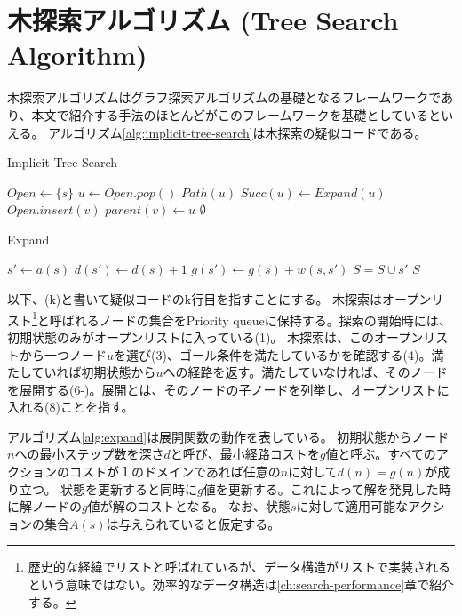 \documentclass[10pt]{book}
\begin{document}
\section{木探索アルゴリズム (Tree Search Algorithm)}
\label{sec:tree-search-algorithm}
木探索アルゴリズムはグラフ探索アルゴリズムの基礎となるフレームワークであり、本文で紹介する手法のほとんどがこのフレームワークを基礎としているといえる。
アルゴリズム\ref{alg:implicit-tree-search}は木探索の疑似コードである。

\begin{algorithm}
\caption{Implicit Tree Search}
\label{alg:implicit-tree-search}
	$Open \leftarrow \{s\}$\;
	 {
		$u \leftarrow Open.pop()$\;
		 {
			\Return $Path(u)$\;
		}
		$Succ(u) \leftarrow Expand(u)$\;
		 {
			$Open.insert(v)$\;
			$parent(v) \leftarrow u$\;
		}
 	}
	\Return $\emptyset$\;
\end{algorithm}

\begin{algorithm}
\caption{Expand}
\label{alg:expand}
	 {
		$s' \leftarrow a(s)$\;
		$d(s') \leftarrow d(s) + 1$\;
		$g(s') \leftarrow g(s) + w(s, s')$\;
		$S = S \cup {s'}$\;
	}
	\Return $S$\;
\end{algorithm}


以下、(k)と書いて疑似コードのk行目を指すことにする。
木探索はオープンリスト\footnote{歴史的な経緯でリストと呼ばれているが、データ構造がリストで実装されるという意味ではない。効率的なデータ構造は\ref{ch:search-performance}章で紹介する。}と呼ばれるノードの集合をPriority queueに保持する。探索の開始時には、初期状態のみがオープンリストに入っている(1)。
木探索は、このオープンリストから一つノード$u$を選び(3)、ゴール条件を満たしているかを確認する(4)。満たしていれば初期状態から$u$への経路を返す。満たしていなければ、そのノードを展開する(6-)。展開とは、そのノードの子ノードを列挙し、オープンリストに入れる(8)ことを指す。

アルゴリズム\ref{alg:expand}は展開関数の動作を表している。
初期状態からノード$n$への最小ステップ数を深さ$d$と呼び、最小経路コストを$g$値と呼ぶ。すべてのアクションのコストが１のドメインであれば任意の$n$に対して$d(n) = g(n)$が成り立つ。
状態を更新すると同時に$g$値を更新する。これによって解を発見した時に解ノードの$g$値が解のコストとなる。
なお、状態$s$に対して適用可能なアクションの集合$A(s)$は与えられていると仮定する。
\end{document}

